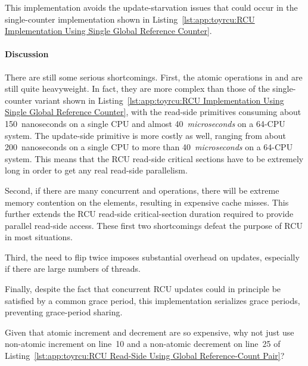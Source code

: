 This implementation avoids the update-starvation issues that could
occur in the single-counter implementation shown in
Listing~\ref{lst:app:toyrcu:RCU Implementation Using Single Global Reference Counter}.

\paragraph{Discussion}

There are still some serious shortcomings.
First, the atomic operations in 
and 
are still quite heavyweight.
In fact, they are more complex than those
of the single-counter variant shown in
Listing~\ref{lst:app:toyrcu:RCU Implementation Using Single Global Reference Counter},
with the read-side primitives consuming about 150~nanoseconds on a single
 CPU and almost 40~\emph{microseconds} on a 64-CPU system.
The update-side  primitive is more costly as
well, ranging from about 200~nanoseconds on a single  CPU to
more than 40~\emph{microseconds} on a 64-CPU system.
This means that the RCU read-side critical sections
have to be extremely long in order to get any real
read-side parallelism.

Second, if there are many concurrent 
and  operations, there will
be extreme memory contention on the 
elements, resulting in expensive cache misses.
This further extends the RCU read-side critical-section
duration required to provide parallel read-side access.
These first two shortcomings defeat the purpose of RCU in most
situations.

Third, the need to flip  twice imposes substantial
overhead on updates, especially if there are large
numbers of threads.

Finally, despite the fact that concurrent RCU updates could in principle be
satisfied by a common grace period, this implementation
serializes grace periods, preventing grace-period
sharing.

\QuickQuiz{}
	Given that atomic increment and decrement are so expensive,
	why not just use non-atomic increment on line~10 and a
	non-atomic decrement on line~25 of
	Listing~\ref{lst:app:toyrcu:RCU Read-Side Using Global Reference-Count Pair}?
 \QuickQuizEnd

